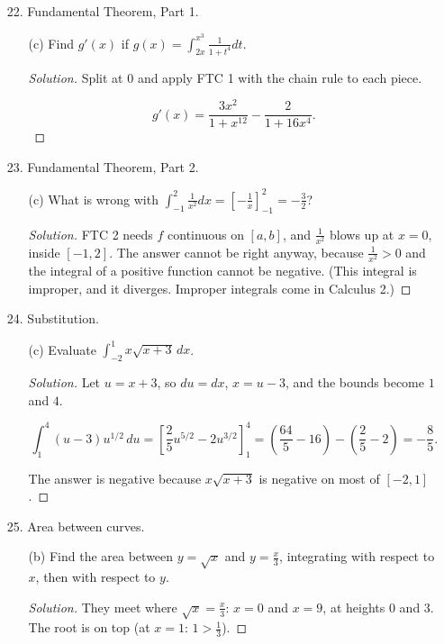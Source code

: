 \documentclass[12pt]{article}
\newcommand\parens[1]{\left( #1 \right)}
\newcommand\brac[1]{\left[ #1 \right]}
\newenvironment{solution}
  {\renewcommand\qedsymbol{$\blacksquare$}\begin{proof}[Solution]}
  {\end{proof}}
\begin{document}
\begin{enumerate}
\begin{enumerate}
\begin{solution}
\[\text{displacement} = 16 - 7 = 9\ \text{m}, \qquad \text{distance} = 16 + 7 = 23\ \text{m}.\]

The position at $t = 10$ is $3 + 9 = 12$ m. The acceleration at $t=5$ is the slope of the segment from $(4,4)$ to $(7,-2)$, which is $-2\ \text{m/s}^2$.

The particle moves forward while $v>0$ and backward after $t=6$, so it is farthest from the start at $t = 6$, $16$ m away.
\end{solution}
\end{enumerate}
\item[22.] Fundamental Theorem, Part 1.
\begin{enumerate}
\item[(c)] Find $g'(x)$ if $g(x) = \int_{2x}^{x^3} \frac{1}{1+t^4} dt$.
\begin{solution}
Split at $0$ and apply FTC 1 with the chain rule to each piece.

\[g'(x) = \frac{3x^2}{1+x^{12}} - \frac{2}{1+16x^4}.\]
\end{solution}
\end{enumerate}
\item[23.] Fundamental Theorem, Part 2.
\begin{enumerate}
\item[(c)] What is wrong with $\int_{-1}^2 \frac{1}{x^2} dx = \brac{-\frac{1}{x}}_{-1}^2 = -\frac{3}{2}$?
\begin{solution}
FTC 2 needs $f$ continuous on $[a,b]$, and $\frac{1}{x^2}$ blows up at $x=0$, inside $[-1,2]$. The answer cannot be right anyway, because $\frac1{x^2} > 0$ and the integral of a positive function cannot be negative. (This integral is improper, and it diverges. Improper integrals come in Calculus 2.)
\end{solution}
\end{enumerate}
\item[24.] Substitution.
\begin{enumerate}
\item[(c)] Evaluate $\int_{-2}^1 x\sqrt{x+3}\, dx$.
\begin{solution}
Let $u = x+3$, so $du = dx$, $x = u - 3$, and the bounds become $1$ and $4$.

\[\int_1^4 (u-3)u^{1/2}\,du = \brac{\frac25u^{5/2} - 2u^{3/2}}_1^4 = \parens{\frac{64}{5} - 16} - \parens{\frac25 - 2} = -\frac85.\]

The answer is negative because $x\sqrt{x+3}$ is negative on most of $[-2,1]$.
\end{solution}
\end{enumerate}
\item[25.] Area between curves.
\begin{enumerate}
\item[(b)] Find the area between $y = \sqrt{x}$ and $y = \frac{x}{3}$, integrating with respect to $x$, then with respect to $y$.
\begin{solution}
They meet where $\sqrt x = \frac x3$: $x = 0$ and $x = 9$, at heights $0$ and $3$. The root is on top (at $x = 1$: $1 > \frac13$).


\end{solution}
\end{enumerate}
\end{enumerate}
\end{document}
